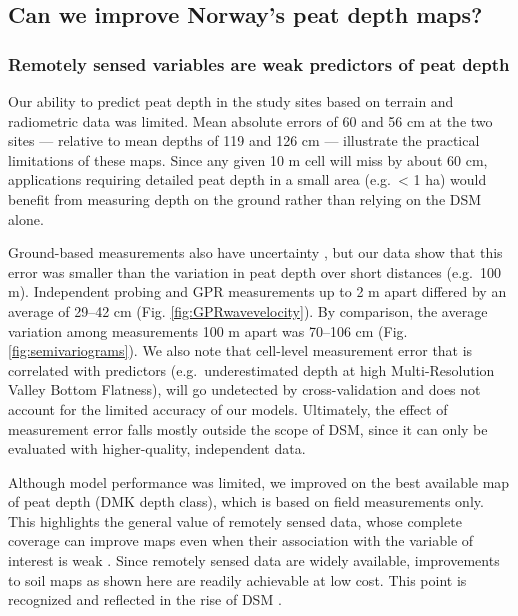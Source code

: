 \documentclass[soil, manuscript]{copernicus}
\begin{document}
\subsection{Can we improve Norway's peat depth maps?}

\subsubsection{Remotely sensed variables are weak predictors of peat depth}

Our ability to predict peat depth in the study sites based on terrain and radiometric data was limited.
Mean absolute errors of 60 and 56 cm at the two sites --- relative to mean depths of 119 and 126 cm --- illustrate the practical limitations of these maps.
Since any given 10 m cell will miss by about 60 cm, applications requiring detailed peat depth in a small area (e.g.~\textless{} 1 ha) would benefit from measuring depth on the ground rather than relying on the DSM alone.

Ground-based measurements also have uncertainty \citep{parryEvaluatingApproachesEstimating2014}, but our data show that this error was smaller than the variation in peat depth over short distances (e.g.~100 m).
Independent probing and GPR measurements up to 2 m apart differed by an average of 29--42 cm (Fig. \ref{fig:GPRwavevelocity}).
By comparison, the average variation among measurements 100 m apart was 70--106 cm (Fig. \ref{fig:semivariograms}).
We also note that cell-level measurement error that is correlated with predictors (e.g.~underestimated depth at high Multi-Resolution Valley Bottom Flatness), will go undetected by cross-validation and does not account for the limited accuracy of our models.
Ultimately, the effect of measurement error falls mostly outside the scope of DSM, since it can only be evaluated with higher-quality, independent data.

Although model performance was limited, we improved on the best available map of peat depth (DMK depth class), which is based on field measurements only.
This highlights the general value of remotely sensed data, whose complete coverage can improve maps even when their association with the variable of interest is weak \citep{mulderUseRemoteSensing2011}.
Since remotely sensed data are widely available, improvements to soil maps as shown here are readily achievable at low cost.
This point is recognized and reflected in the rise of DSM \citep{minasnyDigitalMappingPeatlands2019}.
\end{document}
